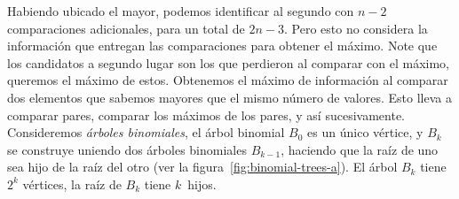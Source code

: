   Habiendo ubicado el mayor,
  podemos identificar al segundo con \(n - 2\) comparaciones adicionales,
  para un total de \(2 n - 3\).
  Pero esto no considera la información
  que entregan las comparaciones para obtener el máximo.
  Note que los candidatos a segundo lugar
  son los que perdieron al comparar con el máximo,
  queremos el máximo de estos.
  Obtenemos el máximo de información
  al comparar dos elementos que sabemos mayores que el mismo número de valores.
  Esto lleva a comparar pares,
  comparar los máximos de los pares,
  y así sucesivamente.
  Consideremos \emph{árboles binomiales},
  el árbol binomial \(B_0\) es un único vértice,
  y \(B_k\) se construye uniendo dos árboles binomiales \(B_{k - 1}\),
  haciendo que la raíz de uno sea hijo de la raíz del otro
  (ver la figura~\ref{fig:binomial-trees-a}).
  El árbol \(B_k\) tiene \(2^k\) vértices,
  la raíz de \(B_k\) tiene \(k\)~hijos.
